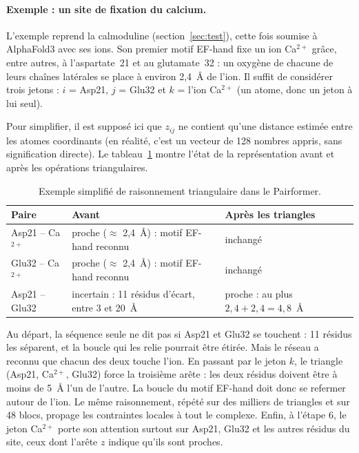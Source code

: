 \paragraph{Exemple : un site de fixation du calcium.} L'exemple reprend la calmoduline (section~\ref{sec:test}), cette fois soumise à AlphaFold3 avec ses ions. Son premier motif EF-hand fixe un ion Ca$^{2+}$ grâce, entre autres, à l'aspartate~21 et au glutamate~32 : un oxygène de chacune de leurs chaînes latérales se place à environ 2,4~Å de l'ion. Il suffit de considérer trois jetons : $i$ = Asp21, $j$ = Glu32 et $k$ = l'ion Ca$^{2+}$ (un atome, donc un jeton à lui seul).

Pour simplifier, il est supposé ici que $z_{ij}$ ne contient qu'une distance estimée entre les atomes coordinants (en réalité, c'est un vecteur de 128 nombres appris, sans signification directe). Le tableau~\ref{tab:triangle} montre l'état de la représentation avant et après les opérations triangulaires.

\begin{table}[H]
\centering
\footnotesize
\begin{tabularx}{\textwidth}{>{\raggedright\arraybackslash}p{3.2cm}>{\raggedright\arraybackslash}X>{\raggedright\arraybackslash}X}
\toprule
\textbf{Paire} & \textbf{Avant} & \textbf{Après les triangles} \\
\midrule
Asp21 -- Ca$^{2+}$ & proche ($\approx$ 2,4~Å) : motif EF-hand reconnu & inchangé \\
Glu32 -- Ca$^{2+}$ & proche ($\approx$ 2,4~Å) : motif EF-hand reconnu & inchangé \\
Asp21 -- Glu32 & incertain : 11 résidus d'écart, entre 3 et 20~Å & proche : au plus $2{,}4 + 2{,}4 = 4{,}8$~Å \\
\bottomrule
\end{tabularx}
\caption{Exemple simplifié de raisonnement triangulaire dans le Pairformer.}
\label{tab:triangle}
\end{table}

Au départ, la séquence seule ne dit pas si Asp21 et Glu32 se touchent : 11 résidus les séparent, et la boucle qui les relie pourrait être étirée. Mais le réseau a reconnu que chacun des deux touche l'ion. En passant par le jeton $k$, le triangle (Asp21, Ca$^{2+}$, Glu32) force la troisième arête : les deux résidus doivent être à moins de 5~Å l'un de l'autre. La boucle du motif EF-hand doit donc se refermer autour de l'ion. Le même raisonnement, répété sur des milliers de triangles et sur 48 blocs, propage les contraintes locales à tout le complexe. Enfin, à l'étape 6, le jeton Ca$^{2+}$ porte son attention surtout sur Asp21, Glu32 et les autres résidus du site, ceux dont l'arête $z$ indique qu'ils sont proches.

